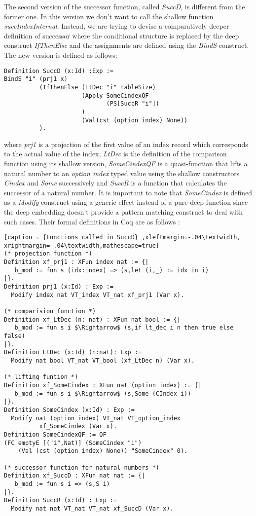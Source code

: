 The second version of the successor function, called \textit{SuccD}, is different from the former one. In this version we don't want to call the shallow function \textit{succIndexInternal}. Instead, we are trying to devise a comparatively deeper definition of successor where the conditional structure is replaced by the deep construct \textit{IfThenElse} and the assignments are defined using the \textit{BindS} construct. The new version is defined as follows: 
\begin{lstlisting}[caption = {Definition of SuccD},label={SuccD}]
Definition SuccD (x:Id) :Exp :=
BindS "i" (prj1 x) 
          (IfThenElse (LtDec "i" tableSize) 
                      (Apply SomeCindexQF
                             (PS[SuccR "i"])
                      ) 
                      (Val(cst (option index) None))
          ).
\end{lstlisting} \vspace{4pt}
where \textit{prj1} is a projection of the first value of an index record which corresponds to the actual value of the index, \textit{LtDec} is the definition of the comparison function using its shallow version, \textit{SomeCindexQF} is a quasi-function that lifts a natural number to an \textit{option index} typed value using the shallow constructors \textit{Cindex} and \textit{Some} successively and \textit{SuccR} is a function that calculates the successor of a natural number. It is important to note that \textit{SomeCindex} is defined as a \textit{Modify} construct using a generic effect instead of a pure deep function since the deep embedding doesn’t provide a pattern matching construct to deal with such cases. Their formal definitions in Coq are as follows :   
\begin{lstlisting}[caption = {Functions called in SuccD} ,xleftmargin=-.04\textwidth,
xrightmargin=-.04\textwidth,mathescape=true]
(* projection function *)
Definition xf_prj1 : XFun index nat := {|
   b_mod := fun s (idx:index) => (s,let (i,_) := idx in i)
|}.
Definition prj1 (x:Id) : Exp :=
  Modify index nat VT_index VT_nat xf_prj1 (Var x). 
  
(* comparision function *)
Definition xf_LtDec (n: nat) : XFun nat bool := {|
   b_mod := fun s i $\Rightarrow$ (s,if lt_dec i n then true else false)
|}.
Definition LtDec (x:Id) (n:nat): Exp :=
  Modify nat bool VT_nat VT_bool (xf_LtDec n) (Var x). 

(* lifting funtion *)
Definition xf_SomeCindex : XFun nat (option index) := {|
   b_mod := fun s i $\Rightarrow$ (s,Some (CIndex i))
|}.
Definition SomeCindex (x:Id) : Exp :=
  Modify nat (option index) VT_nat VT_option_index  
  	      xf_SomeCindex (Var x).
Definition SomeCindexQF := QF 
(FC emptyE [("i",Nat)] (SomeCindex "i") 
    (Val (cst (option index) None)) "SomeCindex" 0).

(* successor function for natural numbers *)
Definition xf_SuccD : XFun nat nat := {|
   b_mod := fun s i => (s,S i)
|}.
Definition SuccR (x:Id) : Exp :=
  Modify nat nat VT_nat VT_nat xf_SuccD (Var x).
\end{lstlisting} \vspace{4pt} 

